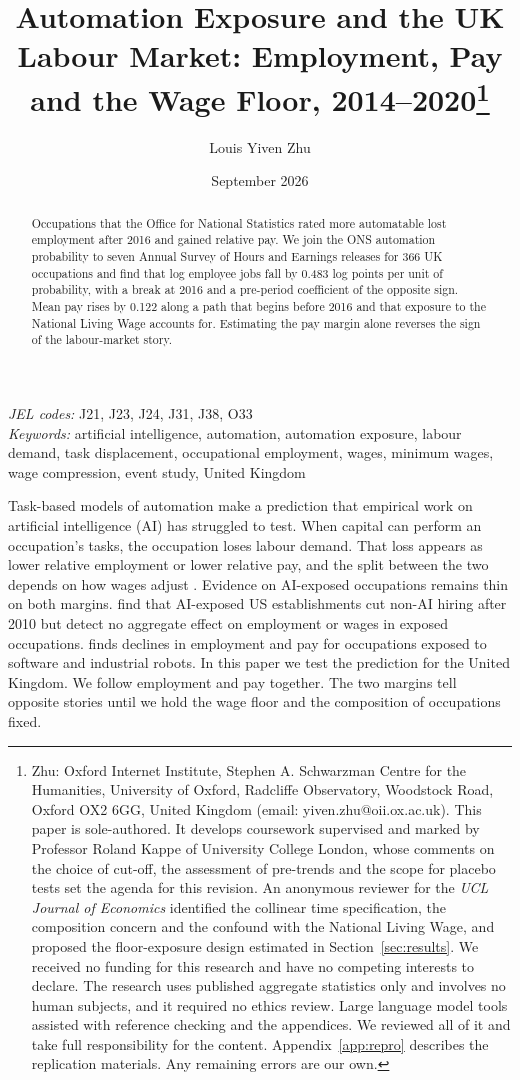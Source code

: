 \documentclass[12pt,leqno]{article}
\title{Automation Exposure and the UK Labour Market: Employment, Pay and the Wage Floor, 2014--2020\thanks{Zhu: Oxford Internet Institute, Stephen A. Schwarzman Centre for the Humanities, University of Oxford, Radcliffe Observatory, Woodstock Road, Oxford OX2 6GG, United Kingdom (email: yiven.zhu@oii.ox.ac.uk). This paper is sole-authored. It develops coursework supervised and marked by Professor Roland Kappe of University College London, whose comments on the choice of cut-off, the assessment of pre-trends and the scope for placebo tests set the agenda for this revision. An anonymous reviewer for the \emph{UCL Journal of Economics} identified the collinear time specification, the composition concern and the confound with the National Living Wage, and proposed the floor-exposure design estimated in Section~\ref{sec:results}. We received no funding for this research and have no competing interests to declare. The research uses published aggregate statistics only and involves no human subjects, and it required no ethics review. Large language model tools assisted with reference checking and the appendices. We reviewed all of it and take full responsibility for the content. Appendix~\ref{app:repro} describes the replication materials. Any remaining errors are our own.}}
\author{Louis Yiven Zhu}
\date{September 2026}
\begin{document}
\maketitle

\begin{abstract}
\noindent Occupations that the Office for National Statistics rated more automatable lost employment after 2016 and gained relative pay. We join the ONS automation probability to seven Annual Survey of Hours and Earnings releases for 366 UK occupations and find that log employee jobs fall by 0.483 log points per unit of probability, with a break at 2016 and a pre-period coefficient of the opposite sign. Mean pay rises by 0.122 along a path that begins before 2016 and that exposure to the National Living Wage accounts for. Estimating the pay margin alone reverses the sign of the labour-market story.
\end{abstract}

\noindent \emph{JEL codes:} J21, J23, J24, J31, J38, O33 \\
\emph{Keywords:} artificial intelligence, automation, automation exposure, labour demand, task displacement, occupational employment, wages, minimum wages, wage compression, event study, United Kingdom

\bigskip

Task-based models of automation make a prediction that empirical work on artificial intelligence (AI) has struggled to test. When capital can perform an occupation's tasks, the occupation loses labour demand. That loss appears as lower relative employment or lower relative pay, and the split between the two depends on how wages adjust \citep{acemoglu2019automation, acemoglu2022tasks}. Evidence on AI-exposed occupations remains thin on both margins. \citet{acemoglu2022vacancies} find that AI-exposed US establishments cut non-AI hiring after 2010 but detect no aggregate effect on employment or wages in exposed occupations. \citet{webb2020impact} finds declines in employment and pay for occupations exposed to software and industrial robots. In this paper we test the prediction for the United Kingdom. We follow employment and pay together. The two margins tell opposite stories until we hold the wage floor and the composition of occupations fixed.
\end{document}
